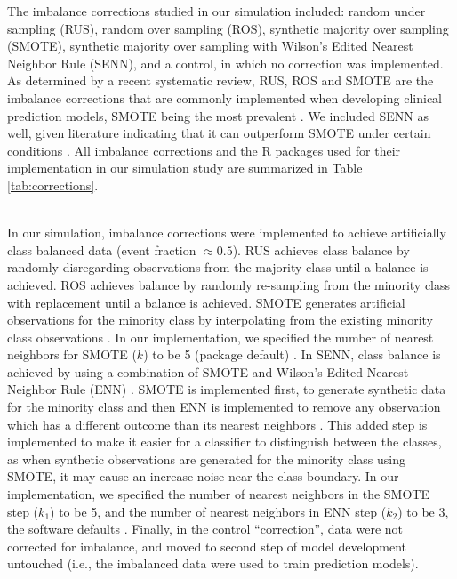 \documentclass[AMA,STIX1COL,]{WileyNJD-v2}
\begin{document}
\hfill\break
The imbalance corrections studied in our simulation included: random
under sampling (RUS), random over sampling (ROS), synthetic majority
over sampling (SMOTE), synthetic majority over sampling with Wilson's
Edited Nearest Neighbor Rule (SENN), and a control, in which no
correction was implemented. As determined by a recent systematic review,
RUS, ROS and SMOTE are the imbalance corrections that are commonly
implemented when developing clinical prediction models, SMOTE being the
most prevalent \citep{constanza}. We included SENN as well, given
literature indicating that it can outperform SMOTE under certain
conditions \citep{senn, heart_failure_senn}. All imbalance corrections
and the R packages used for their implementation in our simulation study
are summarized in Table \ref{tab:corrections}.\\
\strut \\
In our simulation, imbalance corrections were implemented to achieve
artificially class balanced data (event fraction \(\approx 0.5\)). RUS
achieves class balance by randomly disregarding observations from the
majority class until a balance is achieved. ROS achieves balance by
randomly re-sampling from the minority class with replacement until a
balance is achieved. SMOTE generates artificial observations for the
minority class by interpolating from the existing minority class
observations \citep{chawla}. In our implementation, we specified the
number of nearest neighbors for SMOTE (\(k\)) to be 5 (package default)
\citep{iric}. In SENN, class balance is achieved by using a combination
of SMOTE and Wilson's Edited Nearest Neighbor Rule (ENN) \citep{wilson}.
SMOTE is implemented first, to generate synthetic data for the minority
class and then ENN is implemented to remove any observation which has a
different outcome than its nearest neighbors \citep{senn}. This added
step is implemented to make it easier for a classifier to distinguish
between the classes, as when synthetic observations are generated for
the minority class using SMOTE, it may cause an increase noise near the
class boundary. In our implementation, we specified the number of
nearest neighbors in the SMOTE step (\(k_1\)) to be 5, and the number of
nearest neighbors in ENN step (\(k_2\)) to be 3, the software defaults
\citep{iric}. Finally, in the control ``correction'', data were not
corrected for imbalance, and moved to second step of model development
untouched (i.e., the imbalanced data were used to train prediction
models).\\
\end{document}
